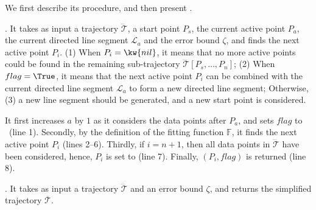 {We first describe its procedure, and then present \operb.

. It takes as input a trajectory $\dddot{\mathcal{T}}$, a start point $P_s$, the current active point $P_a$, the current directed line segment $\mathcal{L}_a$ and the error bound $\zeta$, and finds the next active point $P_i$. (1) When $P_i = \kw{nil}$, it means that no more active points could be found in the remaining sub-trajectory $\dddot{\mathcal{T}}[P_s,\ldots,P_n]$; (2) When $flag = \True$, it means that the next active point $P_i$ can be combined with the current directed line segment $\mathcal{L}_a$ to form a new directed line segment; Otherwise, (3) a new line segment should be generated, and a new start point is considered.

It first increases $a$ by $1$ as it considers the data points after $P_a$, and sets $flag$ to \True\ (line 1).
Secondly, by the definition of the fitting function $\mathbb{F}$, it finds the next active point $P_i$ (lines 2--{6}).
Thirdly, if $i = n + 1$, then all data points in $\dddot{\mathcal{T}}$ have been considered, hence, $P_i$ is set to (line 7).
Finally, $(P_i, flag)$ is returned (line 8).



.  It takes as input a trajectory $\dddot{\mathcal{T}}$ and an error bound $\zeta$, and returns the simplified trajectory $\overline{\mathcal{T}}$.

}
